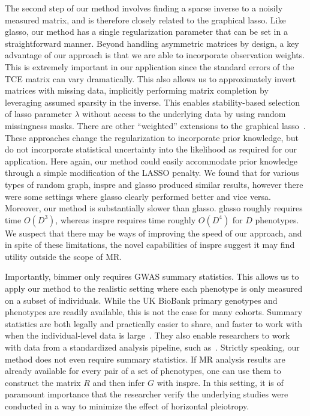 \documentclass{article}
\begin{document}
The second step of our method involves finding a sparse inverse to a noisily measured
matrix, and is therefore closely related to the graphical lasso. Like glasso, our method
 has a single regularization parameter that can be set in a straightforward manner.
 Beyond handling asymmetric matrices by design,
a key advantage of our approach is that we are able to incorporate
observation weights. This is extremely important in our application since the standard errors
of the TCE matrix can vary dramatically. This also allows us to approximately invert matrices
with missing data, implicitly performing matrix completion by leveraging assumed
sparsity in the inverse. This enables stability-based selection of lasso parameter
 $\lambda$ without access to the underlying data by using random missingness masks.
There are other ``weighted'' extensions to the graphical lasso~\cite{Li2015,Zuo2017}.
These approaches change the regularization to incorporate prior knowledge, but do
not incorporate statistical uncertainty into the likelihood as required for our
application. Here again, our method could easily accommodate prior knowledge through a simple
modification of the LASSO penalty.
We found that for various types of random graph,
inspre and glasso produced similar results, however there were some settings where glasso
clearly performed better and vice versa.
Moreover, our method is substantially slower than glasso. glasso roughly requires time
$O(D^3)$, whereas inspre requires time roughly $O(D^4)$ for $D$ phenotypes.
We suspect that there may be ways of improving the speed of our approach,
and in spite of these limitations,
the novel capabilities of inspre suggest it may find utility
outside the scope of MR.

Importantly, bimmer only requires GWAS summary statistics. This allows us to apply our method to
the realistic setting where each phenotype is only measured on a subset of individuals.
While the UK BioBank primary genotypes and phenotypes are readily available,
this is not the case for many cohorts. Summary
statistics are both legally and practically easier to share, and faster to work with when the individual-level
data is large~\cite{Pasaniuc2017}. They also enable researchers to work with data from a
standardized analysis pipeline, such as~\cite{NealeUKBB}.
Strictly speaking, our method does not even require summary statistics. If
MR analysis results are already available for every pair of a set of phenotypes,
one can use them to construct the matrix $R$ and then infer $G$ with
inspre. In this setting, it is of paramount importance that the researcher verify
the underlying studies were conducted in a way to minimize the effect of
horizontal pleiotropy.
\end{document}
